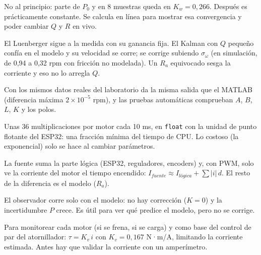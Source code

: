 \documentclass[11pt]{article}
\newcommand{\cod}[1]{\texttt{#1}}
\begin{document}
\begin{preg}
No al principio: parte de $P_0$ y en 8 muestras queda en $K_w=0{,}266$. Después es prácticamente constante. Se calcula en línea para mostrar esa convergencia y poder cambiar $Q$ y $R$ en vivo.
\end{preg}

\begin{preg}
El Luenberger sigue a la medida con su ganancia fija. El Kalman con $Q$ pequeño confía en el modelo y su velocidad se corre; se corrige subiendo $\sigma_\omega$ (en simulación, de 0,94 a 0,32 rpm con fricción no modelada). Un $R_a$ equivocado sesga la corriente y eso no lo arregla $Q$.
\end{preg}

\begin{preg}
Con los mismos datos reales del laboratorio da la misma salida que el MATLAB (diferencia máxima $2\times10^{-5}$ rpm), y las pruebas automáticas comprueban $A$, $B$, $L$, $K$ y los polos.
\end{preg}

\begin{preg}
Unas 36 multiplicaciones por motor cada 10 ms, en \cod{float} con la unidad de punto flotante del ESP32: una fracción mínima del tiempo de CPU. Lo costoso (la exponencial) solo se hace al cambiar parámetros.
\end{preg}

\begin{preg}
La fuente suma la parte lógica (ESP32, reguladores, encoders) y, con PWM, solo ve la corriente del motor el tiempo encendido: $I_{fuente}\approx I_{lógica}+\sum|i|\,d$. El resto de la diferencia es el modelo ($R_a$).
\end{preg}

\begin{preg}
El observador corre solo con el modelo: no hay corrección ($K=0$) y la incertidumbre $P$ crece. Es útil para ver qué predice el modelo, pero no se corrige.
\end{preg}

\begin{preg}
Para monitorear cada motor (si se frena, si se carga) y como base del control de par del atornillador: $\tau=K_v\,i$ con $K_v=0{,}167$ N·m/A, limitando la corriente estimada. Antes hay que validar la corriente con un amperímetro.
\end{preg}
\end{document}
